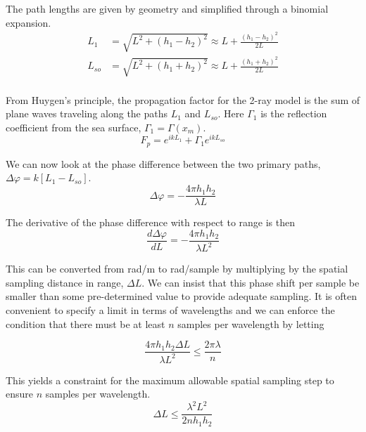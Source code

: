 The path lengths are given by geometry and simplified through a binomial expansion.
\begin{equation}
\begin{aligned}
L_1 & = \sqrt{L^2 + (h_1-h_2)^2}  \approx L + \frac{(h_1 - h_2)^2}{2L}\\
L_{so} & = \sqrt{L^2 + (h_1+h_2)^2}  \approx L + \frac{(h_1 + h_2)^2}{2L}\\
\end{aligned}
\label{mp_eq:1}
\end{equation}
\renewcommand{\baselinestretch}{2} \small\normalsize

From Huygen's principle, the propagation factor for the 2-ray model is the sum of plane waves traveling along the paths $L_1$ and $L_{so}$. Here $\Gamma_1$ is the reflection coefficient from the sea surface, $\Gamma_1 = \Gamma(x_m)$.
\begin{equation}
\boxed{F_p = e^{ikL_1} + \Gamma_1e^{ikL_{so}}}
\label{mp_eq:1b}
\end{equation}

We can now look at the phase difference between the two primary paths, $\Delta\varphi = k\left[ L_1 - L_{so}\right]$.
\begin{equation}
\boxed{\Delta\varphi = -\frac{4\pi h_1h_2}{\lambda L}}
\label{mp_eq:7}
\end{equation}
\renewcommand{\baselinestretch}{2} \small\normalsize

\noindent The derivative of the phase difference with respect to range is then
\begin{equation}
\frac{d\Delta\varphi}{dL}=-\frac{4\pi h_1h_2}{\lambda L^2}
\label{mp_eq:8}
\end{equation}

\noindent This can be converted from rad/m to rad/sample by multiplying by the spatial sampling distance in range, $\Delta L$. We can insist that this phase shift per sample be smaller than some pre-determined value to provide adequate sampling. It is often convenient to specify a limit in terms of wavelengths and we can enforce the condition that there must be at least $n$ samples per wavelength by letting

\begin{equation}
\frac{4\pi h_1h_2\Delta L}{\lambda L^2} \leq \frac{2\pi \lambda}{n}
\label{mp_eq:10}
\end{equation}

This yields a constraint for the maximum allowable spatial sampling step to ensure $n$ samples per wavelength.
\begin{equation}
\boxed{\Delta L \leq \frac{\lambda^2 L^2}{2nh_1h_2}}
\label{mp_eq:11}
\end{equation}

